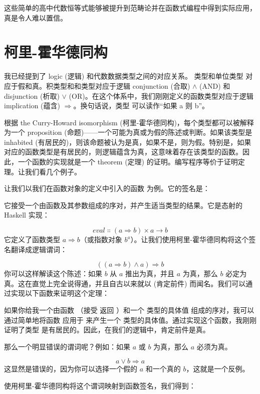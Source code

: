 这些简单的高中代数恒等式能够被提升到范畴论并在函数式编程中得到实际应用，真是令人难以置信。

\section{柯里-霍华德同构}

我已经提到了 logic (逻辑) 和代数数据类型之间的对应关系。 类型和单位类型 \code{()} 对应于假和真。积类型和和类型对应于逻辑 conjunction (合取) $\wedge$ (AND) 和 disjunction (析取) $\vee$ (OR)。在这个体系中，我们刚刚定义的函数类型对应于逻辑 implication (蕴含) $\Rightarrow$。换句话说，类型  可以读作“如果 a 则 b”。

根据 the Curry-Howard isomorphism (柯里-霍华德同构)，每个类型都可以被解释为一个 proposition (命题)——一个可能为真或为假的陈述或判断。如果该类型是 inhabited (有居民的)，则该命题被认为是真，如果不是，则为假。特别是，如果对应的函数类型是有居民的，则逻辑蕴含为真，这意味着存在该类型的函数。因此，一个函数的实现就是一个 theorem (定理) 的证明。编写程序等价于证明定理。让我们看几个例子。

让我们以我们在函数对象的定义中引入的函数  为例。它的签名是：

它接受一个由函数及其参数组成的序对，并产生适当类型的结果。它是态射的 Haskell 实现：

\[\mathit{eval} \Colon (a \Rightarrow b) \times a \to b\]
它定义了函数类型 $a \Rightarrow b$（或指数对象 $b^{a}$）。让我们使用柯里-霍华德同构将这个签名翻译成逻辑谓词：

\[((a \Rightarrow b) \wedge a) \Rightarrow b\]
你可以这样解读这个陈述：如果 $b$ 从 $a$ 推出为真，并且 $a$ 为真，那么 $b$ 必定为真。这在直觉上完全说得通，并且自古以来就以  (肯定前件) 而闻名。我们可以通过实现以下函数来证明这个定理：

如果你给我一个由函数 （接受  返回 ）和一个  类型的具体值  组成的序对，我可以通过简单地将函数  应用于  来产生一个  类型的具体值。通过实现这个函数，我刚刚证明了类型  是有居民的。因此，在我们的逻辑中，肯定前件是真。

那么一个明显错误的谓词呢？例如：如果 $a$ 或 $b$ 为真，那么 $a$ 必须为真。

\[a \vee b \Rightarrow a\]
这显然是错误的，因为你可以选择一个假的 $a$ 和一个真的 $b$，这就是一个反例。

使用柯里-霍华德同构将这个谓词映射到函数签名，我们得到：


